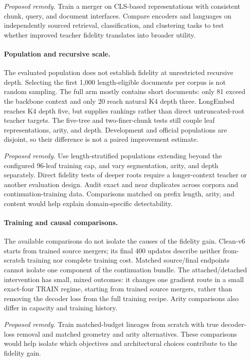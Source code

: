 \documentclass[10pt]{article}
\begin{document}
\emph{Proposed remedy.} Train a merger on CLS-based representations with
consistent chunk, query, and document interfaces. Compare encoders and languages
on independently sourced retrieval, classification, and clustering tasks to
test whether improved teacher fidelity translates into broader utility.

\paragraph{Population and recursive scale.}
The evaluated population does not establish fidelity at unrestricted recursive depth.
Selecting the first 1,000 length-eligible documents per corpus is not random
sampling. The full arm mostly contains short documents: only 81 exceed the
backbone context and only 20 reach natural K4 depth three. LongEmbed reaches
K4 depth five, but supplies rankings rather than direct untruncated-root
teacher targets. The five-tree and two-finer-chunk tests still couple leaf
representations, arity, and depth. Development and official populations are disjoint, so their difference is not
a paired improvement estimate.

\emph{Proposed remedy.} Use length-stratified populations extending beyond
the configured 96-leaf training cap, and vary segmentation, arity, and depth
separately. Direct fidelity tests of deeper roots require a longer-context
teacher or another evaluation design. Audit exact and near duplicates across
corpora and continuation-training data. Comparisons matched on prefix length,
arity, and content would help explain domain-specific detectability.

\paragraph{Training and causal comparisons.}
The available comparisons do not isolate the causes of the fidelity gain.
Clean-v6 starts from trained source mergers; its final 400 updates describe
neither from-scratch training nor complete training cost. Matched source/final
endpoints cannot isolate one component of the continuation bundle. The
attached/detached intervention has small, mixed outcomes: it changes one
gradient route in a small exact-four TRAIN regime, starting from trained source
mergers, rather than removing the decoder loss from the full training recipe.
Arity comparisons also differ in capacity and training history.

\emph{Proposed remedy.} Train matched-budget lineages from scratch with
true decoder-loss removal and matched geometry and arity alternatives. These
comparisons would help isolate which objectives and architectural choices
contribute to the fidelity gain.
\end{document}
